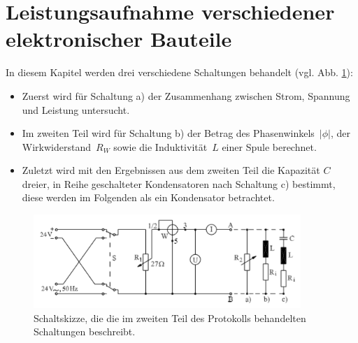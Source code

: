 \section[Leistungsaufnahme]{Leistungsaufnahme verschiedener elektronischer Bauteile}
In diesem Kapitel werden  drei verschiedene Schaltungen behandelt (vgl. Abb. \ref{fig:Leistungsaufnahme}):
\begin{itemize}
	\item Zuerst wird für Schaltung a) der Zusammenhang zwischen Strom, Spannung und Leistung untersucht.
	\item Im zweiten Teil wird für Schaltung b) der Betrag des Phasenwinkels~$|\phi|$, der Wirkwiderstand~$R_W$ sowie die Induktivität~$L$ einer Spule	 berechnet.
	\item Zuletzt wird mit den Ergebnissen aus dem zweiten Teil die Kapazität $C$ dreier, in Reihe geschalteter Kondensatoren nach Schaltung c) bestimmt, diese werden im Folgenden als ein Kondensator betrachtet.
\end{itemize}


\begin{figure}[h]
	\centering
	\includegraphics[width=0.9\textwidth]{res/Schaltskizze.png}
	\caption{Schaltskizze, die die im zweiten Teil des Protokolls behandelten Schaltungen beschreibt.\cite{lw}}
	\label{fig:Leistungsaufnahme}
\end{figure}

